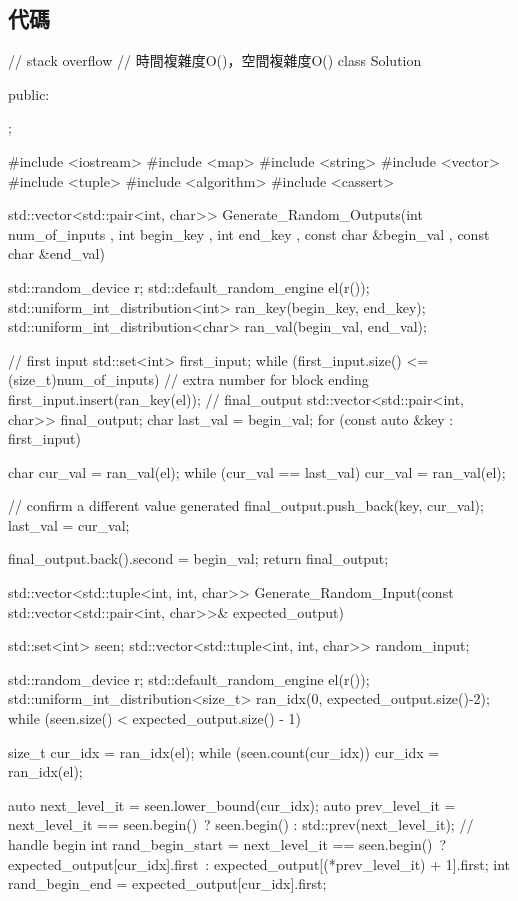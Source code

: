 \subsection{代碼}
\begin{Code}
// stack overflow
// 時間複雜度O()，空間複雜度O()
class Solution {
public:

};

#include <iostream>
#include <map>
#include <string>
#include <vector>
#include <tuple>
#include <algorithm>
#include <cassert>

std::vector<std::pair<int, char>>
Generate_Random_Outputs(int num_of_inputs
                        , int begin_key
                        , int end_key
                        , const char &begin_val
                        , const char &end_val)
{
    std::random_device r;
    std::default_random_engine el(r());
    std::uniform_int_distribution<int> ran_key(begin_key, end_key);
    std::uniform_int_distribution<char> ran_val(begin_val, end_val);

    // first input
    std::set<int> first_input;
    while (first_input.size() <= (size_t)num_of_inputs) // extra number for block ending
    {
        first_input.insert(ran_key(el));
    }
    // final_output
    std::vector<std::pair<int, char>> final_output;
    char last_val = begin_val;
    for (const auto &key : first_input)
    {
        char cur_val = ran_val(el);
        while (cur_val == last_val)
            cur_val = ran_val(el);

        // confirm a different value generated
        final_output.push_back({key, cur_val});
        last_val = cur_val;
    }
    final_output.back().second = begin_val;
    return final_output;
}

std::vector<std::tuple<int, int, char>>
Generate_Random_Input(const std::vector<std::pair<int, char>>& expected_output)
{
    std::set<int> seen;
    std::vector<std::tuple<int, int, char>> random_input;

    std::random_device r;
    std::default_random_engine el(r());
    std::uniform_int_distribution<size_t> ran_idx(0, expected_output.size()-2);
    while (seen.size() < expected_output.size() - 1)
    {
        size_t cur_idx = ran_idx(el);
        while (seen.count(cur_idx))
            cur_idx = ran_idx(el);

        auto next_level_it = seen.lower_bound(cur_idx);
        auto prev_level_it = next_level_it == seen.begin()\
                              ? seen.begin() : std::prev(next_level_it);
        // handle begin
        int rand_begin_start = next_level_it == seen.begin()\
                                ? expected_output[cur_idx].first\
                                 : expected_output[(*prev_level_it) + 1].first;
        int rand_begin_end = expected_output[cur_idx].first;

}}
\end{Code}
